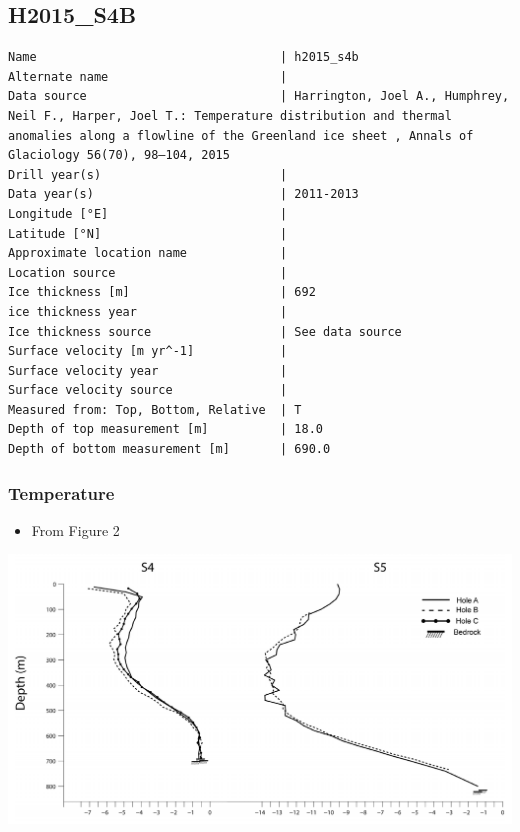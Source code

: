 \documentclass[article,a4paper,times,11pt,twoside]{article}
\begin{document}
\subsection{H2015\_S4B}
\label{sec:org7d41f43}
\begin{verbatim}
Name                                  | h2015_s4b
Alternate name                        | 
Data source                           | Harrington, Joel A., Humphrey, Neil F., Harper, Joel T.: Temperature distribution and thermal anomalies along a flowline of the Greenland ice sheet , Annals of Glaciology 56(70), 98–104, 2015 
Drill year(s)                         | 
Data year(s)                          | 2011-2013
Longitude [°E]                        | 
Latitude [°N]                         | 
Approximate location name             | 
Location source                       | 
Ice thickness [m]                     | 692
ice thickness year                    | 
Ice thickness source                  | See data source
Surface velocity [m yr^-1]            | 
Surface velocity year                 | 
Surface velocity source               | 
Measured from: Top, Bottom, Relative  | T
Depth of top measurement [m]          | 18.0
Depth of bottom measurement [m]       | 690.0
\end{verbatim}

\subsubsection{Temperature}
\label{sec:orgeecb68d}

\begin{itemize}
\item From \textcite{harrington_2015} Figure 2
\end{itemize}

\begin{center}
\includegraphics[width=.9\linewidth]{h2015_s4b/harrington_2015_fig2_S4_S5.png}
\end{center}
\end{document}
